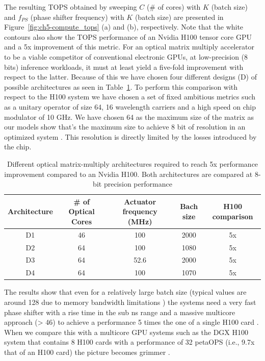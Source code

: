 The resulting TOPS obtained by sweeping $C$ (\# of cores) with $K$ (batch size) and $f_{PS}$ (phase shifter frequency) with $K$ (batch size) are presented in Figure~\ref{fig:ch5-compute_tops} (a) and (b), respectively.
Note that the white contours also show the TOPS performance of an Nvidia H100 tensor core GPU and a 5x improvement of this metric.
For an optical matrix multiply accelerator to be a viable competitor of conventional electronic GPUs, at low-precision (8 bits) inference workloads, it must at least yield a five-fold improvement with respect to the latter.
Because of this we have chosen four different designs (D) of possible architectures as seen in Table~\ref{tab:ch5-compute_tops}.
To perform this comparison with respect to the H100 system we have chosen a set of fixed ambitious metrics such as a unitary operator of size 64, 16 wavelength carriers \cite{noauthor_cw-wdm_nodate} and a high speed on chip modulator of 10 GHz.
We have chosen 64 as the maximum size of the matrix as our models show that's the maximum size to achieve 8 bit of resolution in an optimized system \cite{ward-foxton_optical_2021}.
This resolution is directly limited by the losses introduced by the chip.

\begin{table}
	\centering
	\caption{Different optical matrix-multiply architectures required to reach 5x performance improvement compared to an Nvidia H100. Both architectures are compared at 8-bit precision performance}\label{tab:ch5-compute_tops}
	\begin{tabular}{|c|c|c|c|c|}
		\hline
		Architecture & \# of Optical Cores & Actuator frequency (MHz) & Bach size & H100 comparison \\
		\hline
		D1           & 46                  & 100                      & 2000      & 5x              \\
		\hline
		D2           & 64                  & 100                      & 1080      & 5x              \\
		\hline
		D3           & 64                  & 52.6                     & 2000      & 5x              \\
		\hline
		D4           & 64                  & 100                      & 1070      & 5x              \\
		\hline
	\end{tabular}
\end{table}

The results show that even for a relatively large batch size (typical values are around 128 due to memory bandwidth limitations \cite{noauthor_llm_2023}) the systems need a very fast phase shifter with a rise time in the sub ns range and a massive multicore approach (> 46) to achieve a performance 5 times the one of a single H100 card \cite{noauthor_nvidia_nodate}.
When we compare this with a multicore GPU systems such as the DGX H100 system that contains 8 H100 cards with a performance of 32 petaOPS (i.e., 9.7x that of an H100 card) the picture becomes grimmer \cite{noauthor_nvidia_nodate-1}.

